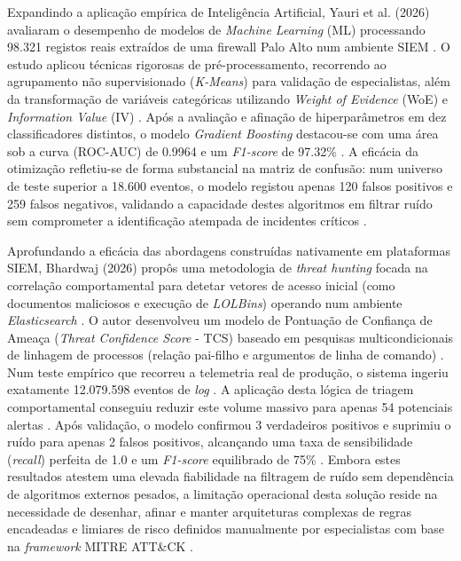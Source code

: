\documentclass[12pt,a4paper]{article}
\begin{document}
Expandindo a aplicação empírica de Inteligência Artificial, Yauri et al. (2026) avaliaram o desempenho de modelos de \textit{Machine Learning} (ML) processando 98.321 registos reais extraídos de uma firewall Palo Alto num ambiente SIEM \cite{yauri2026}. O estudo aplicou técnicas rigorosas de pré-processamento, recorrendo ao agrupamento não supervisionado (\textit{K-Means}) para validação de especialistas, além da transformação de variáveis categóricas utilizando \textit{Weight of Evidence} (WoE) e \textit{Information Value} (IV) \cite{yauri2026}. Após a avaliação e afinação de hiperparâmetros em dez classificadores distintos, o modelo \textit{Gradient Boosting} destacou-se com uma área sob a curva (ROC-AUC) de 0.9964 e um \textit{F1-score} de 97.32\% \cite{yauri2026}. A eficácia da otimização refletiu-se de forma substancial na matriz de confusão: num universo de teste superior a 18.600 eventos, o modelo registou apenas 120 falsos positivos e 259 falsos negativos, validando a capacidade destes algoritmos em filtrar ruído sem comprometer a identificação atempada de incidentes críticos \cite{yauri2026}.

Aprofundando a eficácia das abordagens construídas nativamente em plataformas SIEM, Bhardwaj (2026) propôs uma metodologia de \textit{threat hunting} focada na correlação comportamental para detetar vetores de acesso inicial (como documentos maliciosos e execução de \textit{LOLBins}) operando num ambiente \textit{Elasticsearch} \cite{bhardwaj2026}. O autor desenvolveu um modelo de Pontuação de Confiança de Ameaça (\textit{Threat Confidence Score} - TCS) baseado em pesquisas multicondicionais de linhagem de processos (relação pai-filho e argumentos de linha de comando) \cite{bhardwaj2026}. Num teste empírico que recorreu a telemetria real de produção, o sistema ingeriu exatamente 12.079.598 eventos de \textit{log} \cite{bhardwaj2026}. A aplicação desta lógica de triagem comportamental conseguiu reduzir este volume massivo para apenas 54 potenciais alertas \cite{bhardwaj2026}. Após validação, o modelo confirmou 3 verdadeiros positivos e suprimiu o ruído para apenas 2 falsos positivos, alcançando uma taxa de sensibilidade (\textit{recall}) perfeita de 1.0 e um \textit{F1-score} equilibrado de 75\% \cite{bhardwaj2026}. Embora estes resultados atestem uma elevada fiabilidade na filtragem de ruído sem dependência de algoritmos externos pesados, a limitação operacional desta solução reside na necessidade de desenhar, afinar e manter arquiteturas complexas de regras encadeadas e limiares de risco definidos manualmente por especialistas com base na \textit{framework} MITRE ATT\&CK \cite{bhardwaj2026}.
\end{document}
